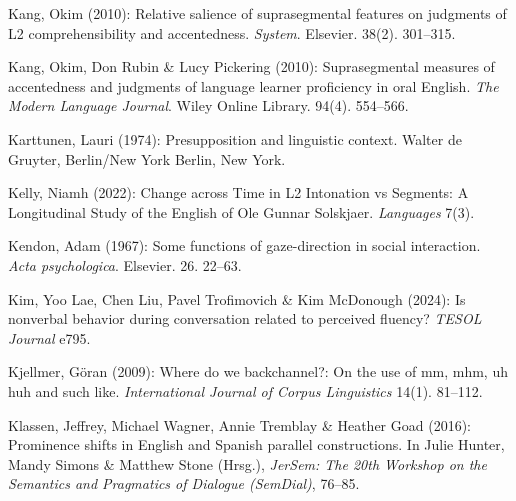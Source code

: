 \begin{styleBibliography}
Kang, Okim (2010): Relative salience of suprasegmental features on judgments of L2 comprehensibility and accentedness. \textit{System}. Elsevier. 38(2). 301–315.
\end{styleBibliography}

\begin{styleBibliography}
Kang, Okim, Don Rubin \& Lucy Pickering (2010): Suprasegmental measures of accentedness and judgments of language learner proficiency in oral English. \textit{The Modern Language Journal}. Wiley Online Library. 94(4). 554–566.
\end{styleBibliography}

\begin{styleBibliography}
Karttunen, Lauri (1974): Presupposition and linguistic context. Walter de Gruyter, Berlin/New York Berlin, New York.
\end{styleBibliography}

\begin{styleBibliography}
Kelly, Niamh (2022): Change across Time in L2 Intonation vs Segments: A Longitudinal Study of the English of Ole Gunnar Solskjaer. \textit{Languages} 7(3).
\end{styleBibliography}

\begin{styleBibliography}
Kendon, Adam (1967): Some functions of gaze-direction in social interaction. \textit{Acta psychologica}. Elsevier. 26. 22–63.
\end{styleBibliography}

\begin{styleBibliography}
Kim, Yoo Lae, Chen Liu, Pavel Trofimovich \& Kim McDonough (2024): Is nonverbal behavior during conversation related to perceived fluency? \textit{TESOL Journal} e795.
\end{styleBibliography}

\begin{styleBibliography}
Kjellmer, Göran (2009): Where do we backchannel?: On the use of mm, mhm, uh huh and such like. \textit{International Journal of Corpus Linguistics} 14(1). 81–112.
\end{styleBibliography}

\begin{styleBibliography}
Klassen, Jeffrey, Michael Wagner, Annie Tremblay \& Heather Goad (2016): Prominence shifts in English and Spanish parallel constructions. In Julie Hunter, Mandy Simons \& Matthew Stone (Hrsg.), \textit{JerSem: The 20th Workshop on the Semantics and Pragmatics of Dialogue (SemDial)}, 76–85.
\end{styleBibliography}

